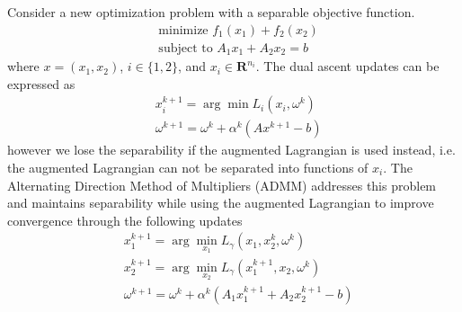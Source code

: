 \documentclass[12pt]{article}
\begin{document}
	Consider a new optimization problem with a separable objective function. 
	\begin{align}
	&\text{minimize } f_1(x_1) + f_2(x_2)\\
	&\text{subject to } A_1x_1 + A_2x_2 = b
	\end{align}
	where $x = (x_1, x_2)$, $i \in \{1,2\}$, and  $x_i \in \mathbf{R}^{n_i}$. The dual ascent updates can be expressed as 
	\begin{align}
	&x_i^{k+1} = \arg\min L_i(x_i, \omega^k)\\
	&\omega^{k+1} = \omega^k + \alpha^k(Ax^{k+1} - b)
	\end{align}
	however we lose the separability if the augmented Lagrangian is used instead, i.e. the augmented Lagrangian can not be separated into functions of $x_i$.  The Alternating Direction Method of Multipliers (ADMM) addresses this problem and maintains separability while using the augmented Lagrangian to improve convergence through the following updates
	\begin{align}
	&x_1^{k+1} = \arg\min_{x_1} L_{\gamma}(x_1, x_2^k, \omega^k)\\
	&x_2^{k+1} = \arg\min_{x_2} L_{\gamma}(x_1^{k+1}, x_2, \omega^k)\\
	&\omega^{k+1} = \omega^k + \alpha^k(A_1x_1^{k+1} + A_2x_2^{k+1} - b)
	\end{align}
	
\end{document}
